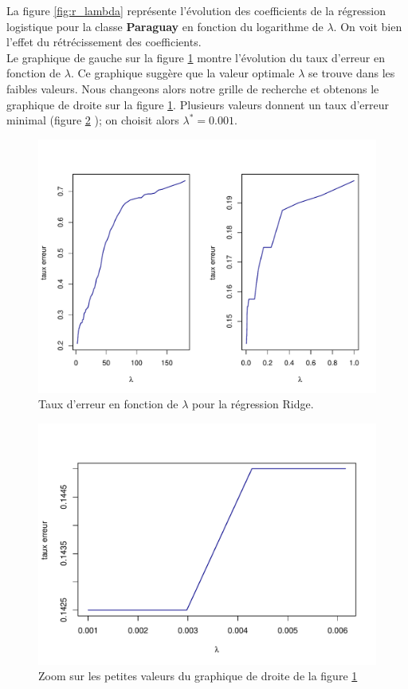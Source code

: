 \documentclass[12pt,a4paper]{article}
\begin{document}
La figure \ref{fig:r_lambda} représente l'évolution des coefficients de la
régression logistique pour la classe \textbf{Paraguay} en fonction du
logarithme de $\lambda$. On voit bien l'effet du rétrécissement des
coefficients.\\
Le graphique de gauche sur la figure \ref{fig:r_lopt} montre l'évolution du
taux d'erreur en fonction de $\lambda$. Ce graphique suggère que la valeur
optimale $\lambda$ se trouve dans les faibles valeurs. Nous changeons alors
notre grille de recherche et obtenons le graphique de droite sur la figure
\ref{fig:r_lopt}. Plusieurs valeurs donnent un taux d'erreur minimal (figure
\ref{fig:zoom_r} ); on choisit alors $\lambda^* = 0.001$.\vspace{2mm}

\begin{figure}[h!]
	\begin{center}
		\includegraphics[scale=0.7]{figures/r_lopt.pdf}
		\caption{Taux d'erreur en fonction de $\lambda$ pour la régression Ridge.}
		\label{fig:r_lopt}
	\end{center}
\end{figure}
\begin{figure}[h!]
	\begin{center}
		\includegraphics[scale=0.5]{figures/zoom_r_lopt.pdf}
		\caption{Zoom sur les petites valeurs du graphique de droite de la figure \ref{fig:r_lopt}}
		\label{fig:zoom_r}
	\end{center}
\end{figure}
\end{document}

